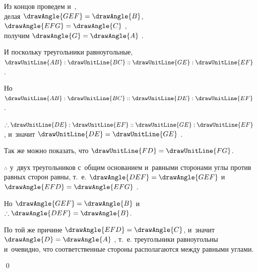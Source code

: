\documentclass[letters,booklanguage=russian]{byrnebook}
\begin{document}
\begin{center}
Из концов  проведем  и~,\\
делая $\drawAngle{GEF} = \drawAngle{B}$, $\drawAngle{EFG} = \drawAngle{C}$ ,\\
получим $\drawAngle{G} = \drawAngle{A}$ .

И поскольку треугольники равноугольные,\\
$\drawUnitLine{AB} : \drawUnitLine{BC} :: \drawUnitLine{GE} : \drawUnitLine{EF}$ .

Но $\drawUnitLine{AB} : \drawUnitLine{BC} :: \drawUnitLine{DE} : \drawUnitLine{EF}$ \byref{\hypref}.

$\therefore \drawUnitLine{DE} : \drawUnitLine{EF} :: \drawUnitLine{GE} : \drawUnitLine{EF}$, и~значит $\drawUnitLine{DE} = \drawUnitLine{GE}$ .

Так же можно показать, что $\drawUnitLine{FD} = \drawUnitLine{FG}$.

$\therefore$ у~двух треугольников с~общим основанием  и~равными сторонами углы против равных сторон равны, т.~е.
$\drawAngle{DEF} = \drawAngle{GEF}$ и~$\drawAngle{EFD} = \drawAngle{EFG}$ .

Но $\drawAngle{GEF} = \drawAngle{B}$ \byref{\constref} и~$\therefore \drawAngle{DEF} = \drawAngle{B}$.

По той же причине $\drawAngle{EFD} = \drawAngle{C}$, и~значит $\drawAngle{D} = \drawAngle{A}$ , т.~е. треугольники равноугольны и~очевидно, что соответственные стороны располагаются между равными углами.
\end{center}

\qed
\end{document}
